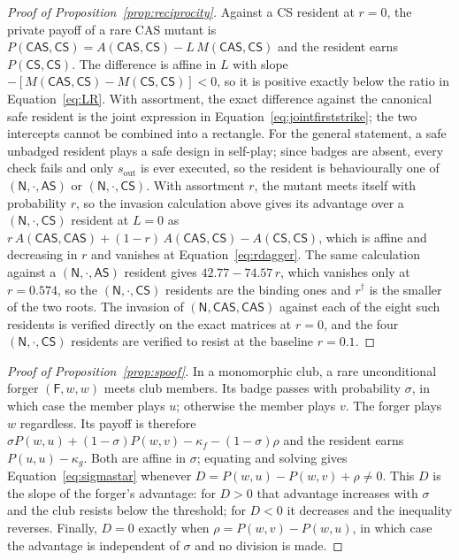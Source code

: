 \documentclass[11pt,a4paper]{article}
\newcommand{\AS}{\textsf{AS}}
\newcommand{\CS}{\textsf{CS}}
\newcommand{\CAS}{\textsf{CAS}}
\begin{document}
\begin{proof}[Proof of Proposition~\ref{prop:reciprocity}]
Against a \CS{} resident at $r=0$, the private payoff of a rare \CAS{} mutant is
$P(\CAS, \CS) = A(\CAS, \CS) - L\,M(\CAS, \CS)$ and the resident earns
$P(\CS,\CS)$. The difference is affine in $L$ with slope
$-[M(\CAS,\CS) - M(\CS,\CS)] < 0$, so it is positive exactly below the ratio
in Equation~\eqref{eq:LR}. With assortment, the exact difference against the
canonical safe resident is the joint expression in Equation~\eqref{eq:jointfirststrike};
the two intercepts cannot be combined into a rectangle. For the general statement, a safe unbadged resident
plays a safe design in self-play; since badges are absent, every check fails
and only $s_{\mathrm{out}}$ is ever executed, so the resident is behaviourally
one of $(\mathsf{N}, \cdot, \AS)$ or $(\mathsf{N}, \cdot, \CS)$. With
assortment $r$, the mutant meets itself with probability $r$, so the invasion
calculation above gives its advantage over a $(\mathsf{N},\cdot,\CS)$
resident at $L = 0$ as
$r\,A(\CAS,\CAS) + (1-r)\,A(\CAS,\CS) - A(\CS,\CS)$, which is affine and
decreasing in $r$ and vanishes at Equation~\eqref{eq:rdagger}. The same
calculation against a $(\mathsf{N},\cdot,\AS)$ resident gives
$42.77 - 74.57\,r$, which vanishes only at $r = 0.574$, so the
$(\mathsf{N},\cdot,\CS)$ residents are the binding ones and $r^{\dagger}$ is
the smaller of the two roots. The invasion of $(\mathsf{N}, \CAS, \CAS)$ against
each of the eight such residents is verified directly on the exact matrices at
$r = 0$, and the four $(\mathsf{N}, \cdot, \CS)$ residents are verified to
resist at the baseline $r = 0.1$.
\end{proof}

\begin{proof}[Proof of Proposition~\ref{prop:spoof}]
In a monomorphic club, a rare unconditional forger $(\mathsf{F}, w, w)$ meets
club members. Its badge passes with probability $\sigma$, in which case the
member plays $u$; otherwise the member plays $v$. The forger plays $w$
regardless. Its payoff is therefore
$\sigma P(w, u) + (1-\sigma) P(w, v) - \kappa_f - (1-\sigma)\rho$ and the
resident earns $P(u,u) - \kappa_g$. Both are affine in $\sigma$; equating and
solving gives Equation~\eqref{eq:sigmastar} whenever
$D=P(w,u)-P(w,v)+\rho\neq0$. This $D$ is the slope of the forger's advantage:
for $D>0$ that advantage increases with $\sigma$ and the club resists below the
threshold; for $D<0$ it decreases and the inequality reverses. Finally,
$D=0$ exactly when $\rho=P(w,v)-P(w,u)$, in which case the advantage is
independent of $\sigma$ and no division is made.
\end{proof}
\end{document}
